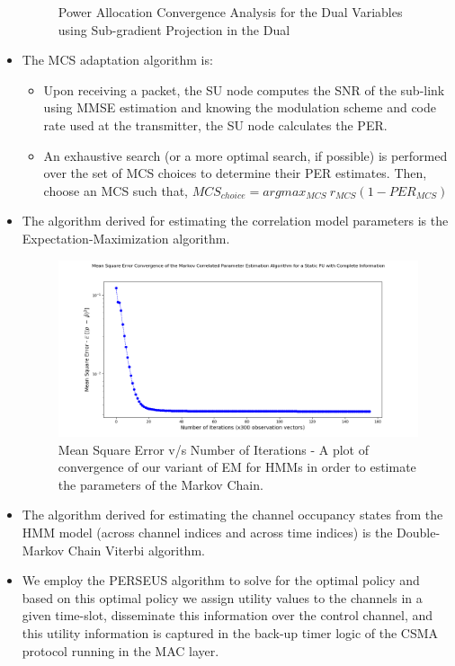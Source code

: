 \documentclass[12pt, draftcls, onecolumn]{IEEEtran}
\begin{document}
\begin{itemize}
\begin{figure}[t]
        \caption{Power Allocation Convergence Analysis for the Dual Variables using Sub-gradient Projection in the Dual}
        \label{fig:mesh1}
        \centering
    \end{figure}
    \item The MCS adaptation algorithm is:
    \begin{itemize}
        \item Upon receiving a packet, the SU node computes the SNR of the sub-link using MMSE estimation and knowing the modulation scheme and code rate used at the transmitter, the SU node calculates the PER.
        \item An exhaustive search (or a more optimal search, if possible) is performed over the set of MCS choices to determine their PER estimates. Then, choose an MCS such that,
        $MCS_{choice}=argmax_{MCS}\ r_{MCS}(1 - PER_{MCS})$
    \end{itemize}
    \item The algorithm derived for estimating the correlation model parameters is the Expectation-Maximization algorithm.
    \begin{figure}[t]
        \includegraphics[width=1.0\textwidth]{Mean_Square_Plot_Log_Scale.png}
        \caption{Mean Square Error v/s Number of Iterations - A plot of convergence of our variant of EM for HMMs in order to estimate the parameters of the Markov Chain.}
        \label{fig:mesh2}
        \centering
    \end{figure}
    \item The algorithm derived for estimating the channel occupancy states from the HMM model (across channel indices and across time indices) is the Double-Markov Chain Viterbi algorithm.
    \item We employ the PERSEUS algorithm to solve for the optimal policy and based on this optimal policy we assign utility values to the channels in a given time-slot, disseminate this information over the control channel, and this utility information is captured in the back-up timer logic of the CSMA protocol running in the MAC layer.

\end{itemize}
\end{document}
